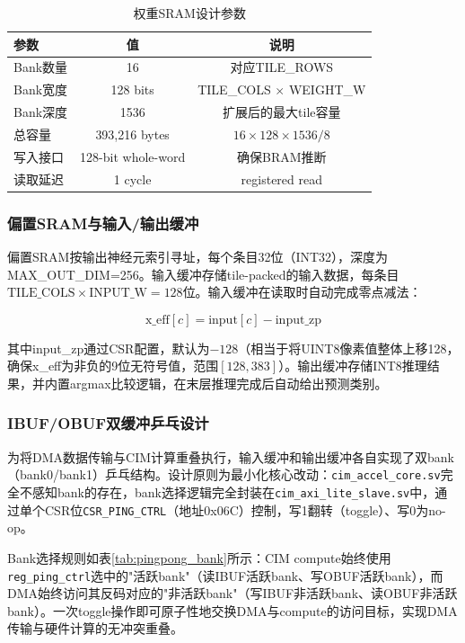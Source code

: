 \documentclass[12pt, a4paper]{article}
\begin{document}
\begin{table}[H]
	\centering
	\caption{权重SRAM设计参数}
	\begin{tabular}{lcc}
		\toprule
		参数 & 值 & 说明 \\
		\midrule
		Bank数量 & 16 & 对应TILE\_ROWS \\
		Bank宽度 & 128 bits & TILE\_COLS $\times$ WEIGHT\_W \\
		Bank深度 & 1536 & 扩展后的最大tile容量 \\
		总容量 & 393,216 bytes & $16 \times 128 \times 1536 / 8$ \\
		写入接口 & 128-bit whole-word & 确保BRAM推断 \\
		读取延迟 & 1 cycle & registered read \\
		\bottomrule
	\end{tabular}
\end{table}

\subsubsection{偏置SRAM与输入/输出缓冲}

偏置SRAM按输出神经元索引寻址，每个条目32位（INT32），深度为MAX\_OUT\_DIM=256。输入缓冲存储tile-packed的输入数据，每条目$\text{TILE\_COLS} \times \text{INPUT\_W} = 128$位。输入缓冲在读取时自动完成零点减法：

\begin{equation}
	\text{x\_eff}[c] = \text{input}[c] - \text{input\_zp}
\end{equation}

其中input\_zp通过CSR配置，默认为$-128$（相当于将UINT8像素值整体上移128，确保x\_eff为非负的9位无符号值，范围$[128,383]$）。输出缓冲存储INT8推理结果，并内置argmax比较逻辑，在末层推理完成后自动给出预测类别。

\subsubsection{IBUF/OBUF双缓冲乒乓设计}

为将DMA数据传输与CIM计算重叠执行，输入缓冲和输出缓冲各自实现了双bank（bank0/bank1）乒乓结构。设计原则为最小化核心改动：\texttt{cim\_accel\_core.sv}完全不感知bank的存在，bank选择逻辑完全封装在\texttt{cim\_axi\_lite\_slave.sv}中，通过单个CSR位\texttt{CSR\_PING\_CTRL}（地址0x06C）控制，写1翻转（toggle）、写0为no-op。

Bank选择规则如表\ref{tab:pingpong_bank}所示：CIM compute始终使用\texttt{reg\_ping\_ctrl}选中的"活跃bank"（读IBUF活跃bank、写OBUF活跃bank），而DMA始终访问其反码对应的"非活跃bank"（写IBUF非活跃bank、读OBUF非活跃bank）。一次toggle操作即可原子性地交换DMA与compute的访问目标，实现DMA传输与硬件计算的无冲突重叠。
\end{document}
